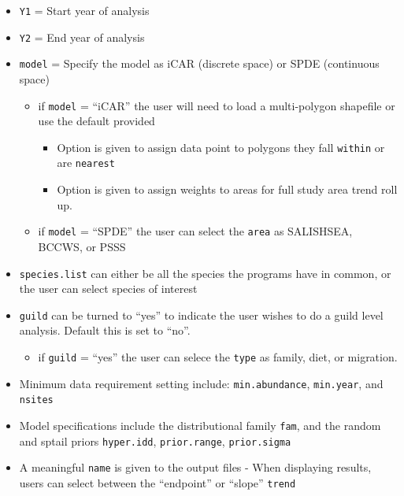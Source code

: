 \documentclass[
  letterpaper,
  DIV=11,
  numbers=noendperiod]{scrreprt}
\providecommand{\tightlist}{%
  \setlength{\itemsep}{0pt}\setlength{\parskip}{0pt}}\usepackage{longtable,booktabs,array}
\begin{document}
\begin{itemize}
\item
  \texttt{Y1} = Start year of analysis
\item
  \texttt{Y2} = End year of analysis
\item
  \texttt{model} = Specify the model as iCAR (discrete space) or SPDE
  (continuous space)

  \begin{itemize}
  \item
    if \texttt{model} = ``iCAR'' the user will need to load a
    multi-polygon shapefile or use the default provided

    \begin{itemize}
    \item
      Option is given to assign data point to polygons they fall
      \texttt{within} or are \texttt{nearest}
    \item
      Option is given to assign weights to areas for full study area
      trend roll up.
    \end{itemize}
  \item
    if \texttt{model} = ``SPDE'' the user can select the \texttt{area}
    as SALISHSEA, BCCWS, or PSSS
  \end{itemize}
\item
  \texttt{species.list} can either be all the species the programs have
  in common, or the user can select species of interest
\item
  \texttt{guild} can be turned to ``yes'' to indicate the user wishes to
  do a guild level analysis. Default this is set to ``no''.

  \begin{itemize}
  \tightlist
  \item
    if \texttt{guild} = ``yes'' the user can selece the \texttt{type} as
    family, diet, or migration.
  \end{itemize}
\item
  Minimum data requirement setting include: \texttt{min.abundance},
  \texttt{min.year}, and \texttt{nsites}
\item
  Model specifications include the distributional family \texttt{fam},
  and the random and sptail priors \texttt{hyper.idd},
  \texttt{prior.range}, \texttt{prior.sigma}
\item
  A meaningful \texttt{name} is given to the output files - When
  displaying results, users can select between the ``endpoint'' or
  ``slope'' \texttt{trend}
\end{itemize}
\end{document}

